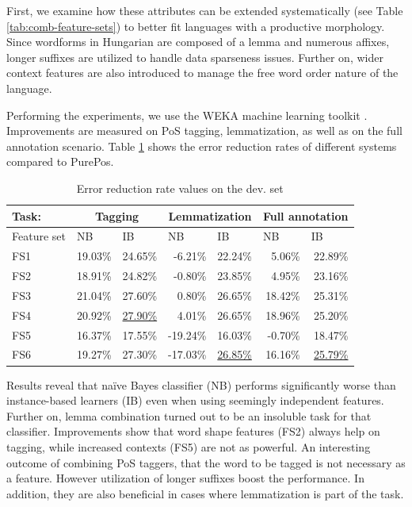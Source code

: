 First, we examine how these attributes can be extended systematically (see Table \ref{tab:comb-feature-sets}) to better fit languages with a productive morphology.
Since wordforms in Hungarian are composed of a lemma and numerous affixes, longer suffixes are utilized to handle data sparseness issues.
Further on, wider context features are also introduced to manage the free word order nature of the language. 


Performing the experiments, we use the WEKA machine learning toolkit \cite{Hall2009}.
Improvements are measured on PoS tagging, lemmatization, as well as on the full annotation scenario.
Table \ref{tab:comb-reduction-rates} shows the error reduction rates of different systems compared to PurePos. 

\begin{table}[h]
\centering
\caption{Error reduction rate values on the dev. set}\label{tab:comb-reduction-rates}
\begin{tabular}{l r r r r r r}
\hline
Task:& \multicolumn{2}{c}{Tagging} & \multicolumn{2}{c}{Lemmatization} & \multicolumn{2}{c}{Full annotation} \\
\hline
Feature set & \multicolumn{1}{l}{NB} & \multicolumn{1}{l}{IB} & \multicolumn{1}{l}{NB} & \multicolumn{1}{l}{IB} & \multicolumn{1}{l}{NB} & \multicolumn{1}{l}{IB} \\
\hline
FS1 & 19.03\% & 24.65\% & -6.21\% & 22.24\% & 5.06\% & 22.89\% \\
FS2 & 18.91\% & 24.82\% & -0.80\% & 23.85\% & 4.95\% & 23.16\% \\
FS3 & 21.04\% & 27.60\% & 0.80\% & 26.65\% & 18.42\% & 25.31\% \\
FS4 & 20.92\% & \underline{27.90\%} & 4.01\% & 26.65\% & 18.96\% & 25.20\% \\
FS5 & 16.37\% & 17.55\% & -19.24\% & 16.03\% & -0.70\% & 18.47\% \\
FS6 & 19.27\% & 27.30\% & -17.03\% & \underline{26.85\%} & 16.16\% & \underline{25.79\%} \\
\hline
\end{tabular}
\end{table}

Results reveal that naïve Bayes classifier (NB) performs significantly worse than instance-based learners (IB) even when using seemingly independent features.
Further on, lemma combination turned out to be an insoluble task for that classifier.
Improvements show that word shape features (FS2) always help on tagging, while increased contexts (FS5) are not as powerful.
An interesting outcome of combining PoS taggers, that the word to be tagged is not necessary as a feature.
However utilization of longer suffixes boost the performance.
In addition, they are also beneficial in cases where lemmatization is part of the task. 

